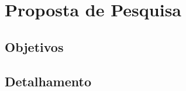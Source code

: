 \pagestyle{fancy}

\chapter{Proposta de Pesquisa}\label{cap2}

\section{Objetivos}

\section{Detalhamento}